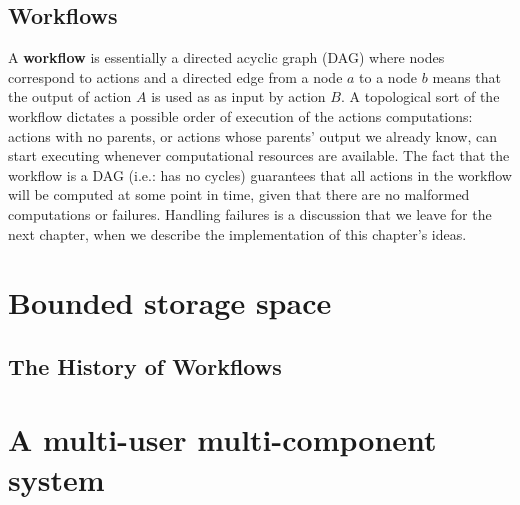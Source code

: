 \subsection{Workflows}
A \textbf{workflow} is essentially a directed acyclic graph (DAG) where nodes correspond to actions and a directed edge from a node $a$ to a node $b$ means that the output of action $A$ is used as as input by action $B$.  A topological sort of the workflow dictates a possible order of execution of the actions computations: actions with no parents, or actions whose parents' output we already know, can start executing whenever computational resources are available. The fact that the workflow is a DAG (i.e.: has no cycles) guarantees that all actions in the workflow will be computed at some point in time, given that there are no malformed computations or failures.  Handling failures is a discussion that we leave for the next chapter, when we describe the implementation of this chapter's ideas.

\section{Bounded storage space}
\subsection{The History of Workflows}
\section{A multi-user multi-component system}